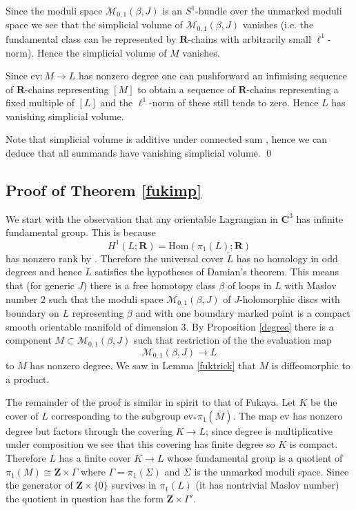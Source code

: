 \documentclass{amsart}
\newcommand{\mM}{\mathcal{M}}
\newcommand{\CC}{\mathbf{C}}
\newcommand{\RR}{\mathbf{R}}
\newcommand{\ZZ}{\mathbf{Z}}
\newcommand{\ev}{\mathrm{ev}}
\newcommand{\Hom}{\mathrm{Hom}}
\begin{document}
Since the moduli space $\mM_{0,1}(\beta,J)$ is an $S^1$-bundle over the unmarked moduli space we see that the simplicial volume of $\mM_{0,1}(\beta,J)$ vanishes (i.e. the fundamental class can be represented by $\RR$-chains with arbitrarily small $\ell^1$-norm). Hence the simplicial volume of $M$ vanishes.

Since $\ev:M\rightarrow L$ has nonzero degree one can pushforward an infimising sequence of $\RR$-chains representing $[M]$ to obtain a sequence of $\RR$-chains representing a fixed multiple of $[L]$ and the $\ell^1$-norm of these still tends to zero. Hence $L$ has vanishing simplicial volume.

Note that simplicial volume is additive under connected sum {\cite[Section 0.2]{GroVol}}, hence we can deduce that all summands have vanishing simplicial volume. \qed


\subsection{Proof of Theorem \ref{fukimp}}
We start with the observation that any orientable Lagrangian in $\CC^3$ has infinite fundamental group. This is because
\[H^1(L;\RR)=\Hom(\pi_1(L);\RR)\]
has nonzero rank by {\cite[Theorem $0.4.A_2$]{Gro}}. Therefore the universal cover $\tilde{L}$ has no homology in odd degrees and hence $L$ satisfies the hypotheses of Damian's theorem. This means that (for generic $J$) there is a free homotopy class $\beta$ of loops in $L$ with Maslov number 2 such that the moduli space $\mM_{0,1}(\beta,J)$ of $J$-holomorphic discs with boundary on $L$ representing $\beta$ and with one boundary marked point is a compact smooth orientable manifold of dimension 3. By Proposition \ref{degree} there is a component $M\subset\mM_{0,1}(\beta,J)$ such that restriction of the the evaluation map
\[\mM_{0,1}(\beta,J)\rightarrow L\]
to $M$ has nonzero degree. We saw in Lemma \ref{fuktrick} that $M$ is diffeomorphic to a product.

The remainder of the proof is similar in spirit to that of Fukaya. Let $K$ be the cover of $L$ corresponding to the subgroup $\ev_*\pi_1(\bar{M})$. The map $\ev$ has nonzero degree but factors through the covering $K\to L$; since degree is multiplicative under composition we see that this covering has finite degree so $K$ is compact. Therefore $L$ has a finite cover $K\rightarrow L$ whose fundamental group is a quotient of $\pi_1(M)\cong\ZZ\times\Gamma$ where $\Gamma=\pi_1(\Sigma)$ and $\Sigma$ is the unmarked moduli space. Since the generator of $\ZZ\times\{0\}$ survives in $\pi_1(L)$ (it has nontrivial Maslov number) the quotient in question has the form $\ZZ\times\Gamma'$.
\end{document}
